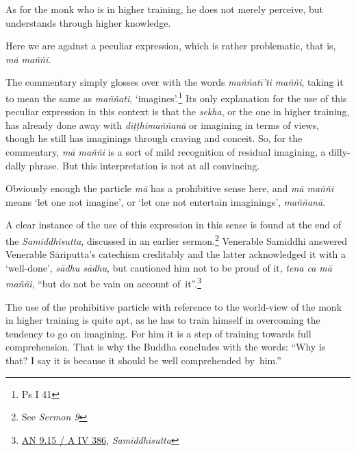 As for the monk who is in higher training, he does not merely perceive, but understands through higher knowledge.

Here we are against a peculiar expression, which is rather problematic, that is, \emph{mā maññi}.

The commentary simply glosses over with the words \emph{maññatī'ti maññi}, taking it to mean the same as \emph{maññati}, `imagines'.\footnote{Ps I 41} Its only explanation for the use of this peculiar expression in this context is that the \emph{sekha}, or the one in higher training, has already done away with \emph{diṭṭhimaññanā} or imagining in terms of views, though he still has imaginings through craving and conceit. So, for the commentary, \emph{mā maññi} is a sort of mild recognition of residual imagining, a dilly-dally phrase. But this interpretation is not at all convincing.

Obviously enough the particle \emph{mā} has a prohibitive sense here, and \emph{mā maññi} means `let one not imagine', or `let one not entertain imaginings', \emph{maññanā}.

A clear instance of the use of this expression in this sense is found at the end of the \emph{Samiddhisutta}, discussed in an earlier sermon.\footnote{See \emph{Sermon 9}} Venerable Samiddhi answered Venerable Sāriputta's catechism creditably and the latter acknowledged it with a `well-done', \emph{sādhu sādhu}, but cautioned him not to be proud of it, \emph{tena ca mā maññi}, ``but do not be vain on account of~it''.\footnote{\href{https://suttacentral.net/an9.15/pli/ms}{AN 9.15 / A IV 386}, \emph{Samiddhisutta}}

The use of the prohibitive particle with reference to the world-view of the monk in higher training is quite apt, as he has to train himself in overcoming the tendency to go on imagining. For him it is a step of training towards full comprehension. That is why the Buddha concludes with the words: ``Why is that? I say it is because it should be well comprehended by~him.''
